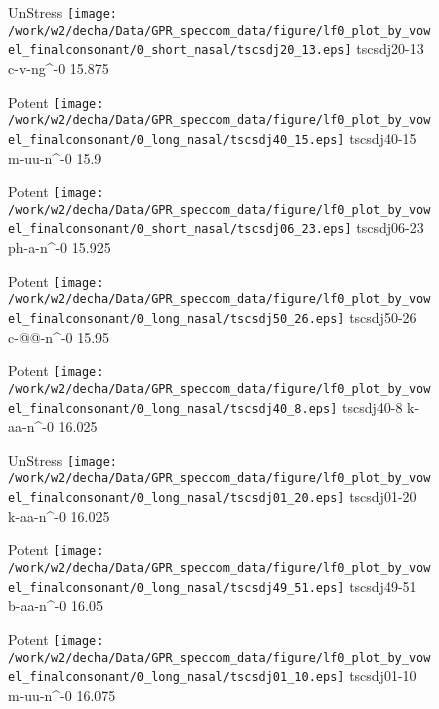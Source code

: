 \documentclass{article}
\begin{document}
\begin{figure}[t]
\begin{minipage}[b]{.24\textwidth}
UnStress
\centering
\texttt{[image: /work/w2/decha/Data/GPR\_speccom\_data/figure/lf0\_plot\_by\_vowel\_finalconsonant/0\_short\_nasal/tscsdj20\_13.eps]}
tscsdj20-13 c-v-ng\textasciicircum-0 15.875
\end{minipage}
\begin{minipage}[b]{.24\textwidth}
\colorbox{Apricot}{Potent}
\centering
\texttt{[image: /work/w2/decha/Data/GPR\_speccom\_data/figure/lf0\_plot\_by\_vowel\_finalconsonant/0\_long\_nasal/tscsdj40\_15.eps]}
tscsdj40-15 m-uu-n\textasciicircum-0 15.9
\end{minipage}
\begin{minipage}[b]{.24\textwidth}
\colorbox{Apricot}{Potent}
\centering
\texttt{[image: /work/w2/decha/Data/GPR\_speccom\_data/figure/lf0\_plot\_by\_vowel\_finalconsonant/0\_short\_nasal/tscsdj06\_23.eps]}
tscsdj06-23 ph-a-n\textasciicircum-0 15.925
\end{minipage}
\begin{minipage}[b]{.24\textwidth}
\colorbox{Apricot}{Potent}
\centering
\texttt{[image: /work/w2/decha/Data/GPR\_speccom\_data/figure/lf0\_plot\_by\_vowel\_finalconsonant/0\_long\_nasal/tscsdj50\_26.eps]}
tscsdj50-26 c-@@-n\textasciicircum-0 15.95
\end{minipage}
\end{figure}

\begin{figure}[t]
\begin{minipage}[b]{.24\textwidth}
\colorbox{Apricot}{Potent}
\centering
\texttt{[image: /work/w2/decha/Data/GPR\_speccom\_data/figure/lf0\_plot\_by\_vowel\_finalconsonant/0\_long\_nasal/tscsdj40\_8.eps]}
tscsdj40-8 k-aa-n\textasciicircum-0 16.025
\end{minipage}
\begin{minipage}[b]{.24\textwidth}
UnStress
\centering
\texttt{[image: /work/w2/decha/Data/GPR\_speccom\_data/figure/lf0\_plot\_by\_vowel\_finalconsonant/0\_long\_nasal/tscsdj01\_20.eps]}
tscsdj01-20 k-aa-n\textasciicircum-0 16.025
\end{minipage}
\begin{minipage}[b]{.24\textwidth}
\colorbox{Apricot}{Potent}
\centering
\texttt{[image: /work/w2/decha/Data/GPR\_speccom\_data/figure/lf0\_plot\_by\_vowel\_finalconsonant/0\_long\_nasal/tscsdj49\_51.eps]}
tscsdj49-51 b-aa-n\textasciicircum-0 16.05
\end{minipage}
\begin{minipage}[b]{.24\textwidth}
\colorbox{Apricot}{Potent}
\centering
\texttt{[image: /work/w2/decha/Data/GPR\_speccom\_data/figure/lf0\_plot\_by\_vowel\_finalconsonant/0\_long\_nasal/tscsdj01\_10.eps]}
tscsdj01-10 m-uu-n\textasciicircum-0 16.075
\end{minipage}
\end{figure}
\end{document}
